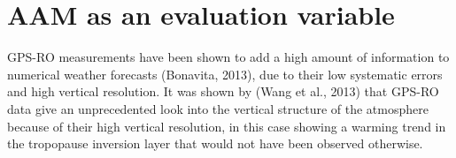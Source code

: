 \section{AAM as an evaluation variable}

GPS-RO measurements have been shown to add a high amount of information to numerical weather forecasts (Bonavita, 2013), due to their low systematic errors and high vertical resolution. It was shown by (Wang et al., 2013) that GPS-RO data give an unprecedented look into the vertical structure of the atmosphere because of their high vertical resolution, in this case showing a warming trend in the tropopause inversion layer that would not have been observed otherwise.
